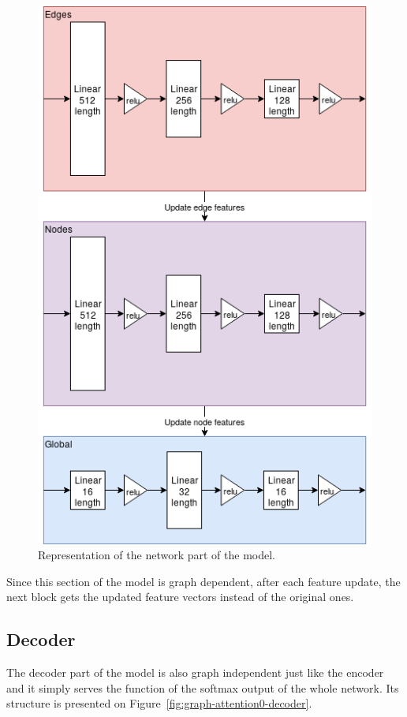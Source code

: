 \begin{figure}[!ht]
	\centering
	\includegraphics[scale=0.5]{figures/GA0_network.png}
	\caption{Representation of the network part of the model.}
	\label{fig:graph-attention0-network}
\end{figure}

Since this section of the model is graph dependent, after each feature update, the next block gets the updated feature vectors instead of the original ones.

\subsection{Decoder}

The decoder part of the model is also graph independent just like the encoder and it simply serves the function of the softmax output of the whole network. Its structure is presented on Figure~\ref{fig:graph-attention0-decoder}.

